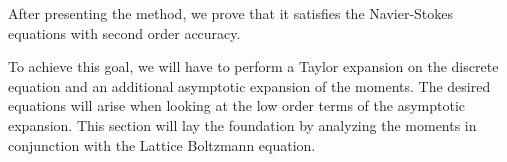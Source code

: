 After presenting the method, we prove that it satisfies the Navier-Stokes equations with second order accuracy.

To achieve this goal, we will have to perform a Taylor expansion on the discrete equation and an additional asymptotic expansion of the moments.
The desired equations will arise when looking at the low order terms of the asymptotic expansion.
This section will lay the foundation by analyzing the moments in conjunction with the Lattice Boltzmann equation.
